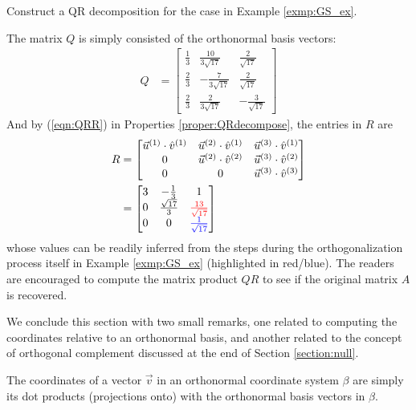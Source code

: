 \begin{exmp}
\label{exmp:QRdecom}
Construct a QR decomposition for the case in Example \ref{exmp:GS_ex}.
\end{exmp}
\begin{solution}
The matrix $Q$ is simply consisted of the orthonormal basis vectors:
\begin{align*}
Q &= 
\begin{bmatrix}
\frac{1}{3} & \frac{10}{3\sqrt{17}} & \frac{2}{\sqrt{17}} \\
\frac{2}{3} & -\frac{7}{3\sqrt{17}} & \frac{2}{\sqrt{17}} \\
\frac{2}{3} & \frac{2}{3\sqrt{17}} & -\frac{3}{\sqrt{17}}
\end{bmatrix}
\end{align*}
And by (\ref{eqn:QRR}) in Properties \ref{proper:QRdecompose}, the entries in $R$ are
\begin{align*}
R &= 
\begin{bmatrix}
\vec{u}^{(1)} \cdot \hat{v}^{(1)} & \vec{u}^{(2)} \cdot \hat{v}^{(1)} & \vec{u}^{(3)} \cdot \hat{v}^{(1)} \\
0 & \vec{u}^{(2)} \cdot \hat{v}^{(2)} & \vec{u}^{(3)} \cdot \hat{v}^{(2)} \\
0 & 0 & \vec{u}^{(3)} \cdot \hat{v}^{(3)}
\end{bmatrix}  \\
&= 
\begin{bmatrix}
3 & -\frac{1}{3} & 1 \\
0 & \frac{\sqrt{17}}{3} & \textcolor{red}{\frac{13}{\sqrt{17}}}  \\
0 & 0 & \textcolor{blue}{\frac{1}{\sqrt{17}}} \\
\end{bmatrix} 
\end{align*}
whose values can be readily inferred from the steps during the orthogonalization process itself in Example \ref{exmp:GS_ex} (highlighted in red/blue). The readers are encouraged to compute the matrix product $QR$ to see if the original matrix $A$ is recovered.
\end{solution}
We conclude this section with two small remarks, one related to computing the coordinates relative to an orthonormal basis, and another related to the concept of orthogonal complement discussed at the end of Section \ref{section:null}.
\begin{proper}
\label{proper:orthocoords}
The coordinates of a vector $\vec{v}$ in an orthonormal coordinate system $\beta$ are simply its dot products (projections onto) with the orthonormal basis vectors in $\beta$.
\end{proper}
